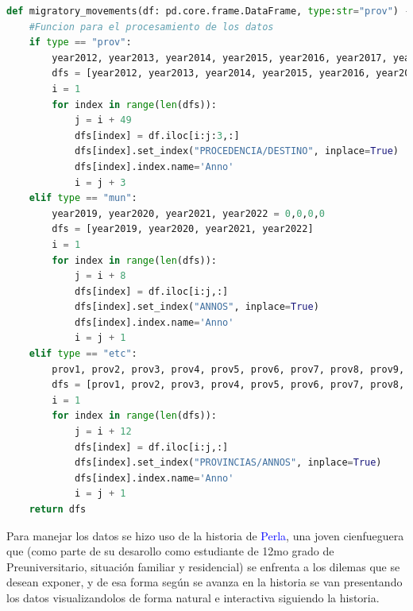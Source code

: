 \documentclass{article}
\begin{document}
\begin{lstlisting}[language=Python, caption=Funcion utilizada para parte del procesamiento de algunos datos]
    def migratory_movements(df: pd.core.frame.DataFrame, type:str="prov") -> list[pd.core.frame.DataFrame]:
    #Funcion para el procesamiento de los datos
    if type == "prov":
        year2012, year2013, year2014, year2015, year2016, year2017, year2018, year2019, year2020, year2021, year2022 = 0,0,0,0,0,0,0,0,0,0,0
        dfs = [year2012, year2013, year2014, year2015, year2016, year2017, year2018, year2019, year2020, year2021, year2022]
        i = 1
        for index in range(len(dfs)):
            j = i + 49
            dfs[index] = df.iloc[i:j:3,:]
            dfs[index].set_index("PROCEDENCIA/DESTINO", inplace=True)
            dfs[index].index.name='Anno'
            i = j + 3
    elif type == "mun":
        year2019, year2020, year2021, year2022 = 0,0,0,0
        dfs = [year2019, year2020, year2021, year2022]
        i = 1
        for index in range(len(dfs)):
            j = i + 8
            dfs[index] = df.iloc[i:j,:]
            dfs[index].set_index("ANNOS", inplace=True)
            dfs[index].index.name='Anno'
            i = j + 1
    elif type == "etc":
        prov1, prov2, prov3, prov4, prov5, prov6, prov7, prov8, prov9, prov10, prov11, prov12, prov13, prov14, prov15 = 0,0,0,0,0,0,0,0,0,0,0,0,0,0,0
        dfs = [prov1, prov2, prov3, prov4, prov5, prov6, prov7, prov8, prov9, prov10, prov11, prov12, prov13, prov14, prov15]
        i = 1
        for index in range(len(dfs)):
            j = i + 12
            dfs[index] = df.iloc[i:j,:]
            dfs[index].set_index("PROVINCIAS/ANNOS", inplace=True)
            dfs[index].index.name='Anno'
            i = j + 1                    
    return dfs
\end{lstlisting}

Para manejar los datos se hizo uso de la historia de \textcolor{blue}{Perla}, una joven cienfueguera que (como parte de su desarollo como estudiante de 12mo grado de Preuniversitario, situación familiar y residencial) se enfrenta a los dilemas que se desean exponer, y de esa forma según se avanza en la historia se van presentando los datos visualizandolos de forma natural e interactiva siguiendo la historia.\\\\
\end{document}
